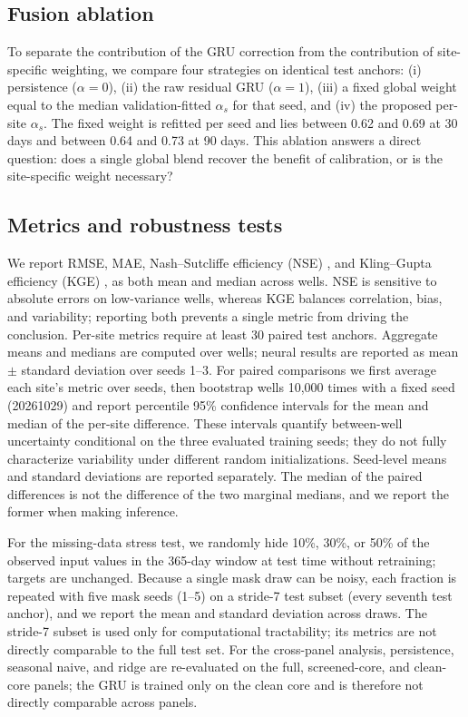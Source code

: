 \documentclass[preprint,12pt]{elsarticle}
\begin{document}
\subsection{Fusion ablation}

To separate the contribution of the GRU correction from the contribution of
site-specific weighting, we compare four strategies on identical test anchors:
(i) persistence ($\alpha=0$), (ii) the raw residual GRU ($\alpha=1$), (iii) a
fixed global weight equal to the median validation-fitted $\alpha_s$ for that
seed, and (iv) the proposed per-site $\alpha_s$. The fixed weight is refitted
per seed and lies between 0.62 and 0.69 at 30 days and between 0.64 and 0.73 at
90 days. This ablation answers a direct question: does a single global blend
recover the benefit of calibration, or is the site-specific weight necessary?

\subsection{Metrics and robustness tests}

We report RMSE, MAE, Nash--Sutcliffe efficiency (NSE)
\citep{nash1970}, and Kling--Gupta efficiency (KGE) \citep{gupta2009}, as both
mean and median across wells. NSE is sensitive to absolute errors on
low-variance wells, whereas KGE balances correlation, bias, and variability;
reporting both prevents a single metric from driving the conclusion. Per-site
metrics require at least 30 paired test anchors. Aggregate means and medians are computed over wells; neural results
are reported as mean $\pm$ standard deviation over seeds 1--3. For paired
comparisons we first average each site's metric over seeds, then bootstrap
wells 10{,}000 times with a fixed seed (20261029) and report percentile 95\%
confidence intervals for the mean and median of the per-site difference. These
intervals quantify between-well uncertainty conditional on the three evaluated
training seeds; they do not fully characterize variability under different
random initializations. Seed-level means and standard deviations are reported
separately. The median of the paired differences is not the difference of the
two marginal medians, and we report the former when making inference.

For the missing-data stress test, we randomly hide 10\%, 30\%, or 50\% of the
observed input values in the 365-day window at test time without retraining;
targets are unchanged. Because a single mask draw can be noisy, each fraction
is repeated with five mask seeds (1--5) on a stride-7 test subset (every
seventh test anchor), and we report the mean and standard deviation across
draws. The stride-7 subset is used only for computational tractability; its
metrics are not directly comparable to the full test set. For the cross-panel
analysis, persistence, seasonal naive, and ridge are re-evaluated on the full,
screened-core, and clean-core panels; the GRU is trained only on the clean core
and is therefore not directly comparable across panels.
\end{document}
